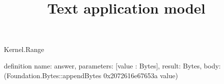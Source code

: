 \begin{lexlean}{Kernel.Range}
\title{Text application model}
\begin{semanticmodule}
definition{
  name: answer,
  parameters: [value : Bytes],
  result: Bytes,
  body: (Foundation.Bytes::appendBytes 0x2072616e67653a value)
}
\end{semanticmodule}
\end{lexlean}
